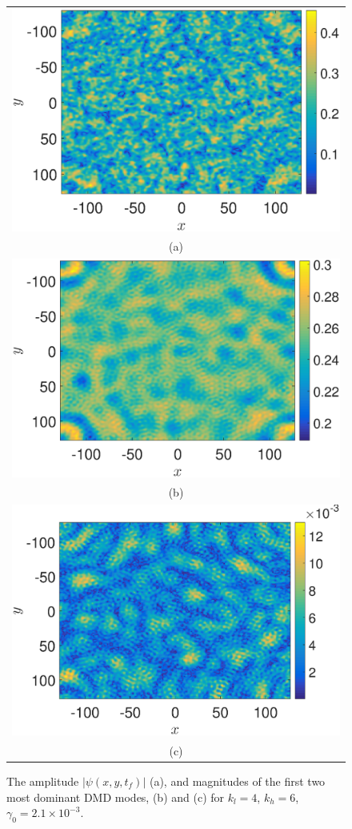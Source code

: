 \documentclass[a4paper,11pt]{article}
\begin{document}
\begin{figure}
\centering
\begin{tabular}{c}
\includegraphics[width=.7\textwidth]{amplitude_wwt_K_128_Lx_128_tf_1pt5e4} \\
(a) \\
\includegraphics[width=.7\textwidth]{dmd1_amplitude_wwt_K_128_Lx_128_tf_1pt5e4} \\
 (b) \\
\includegraphics[width=.7\textwidth]{dmd2_amplitude_wwt_K_128_Lx_128_tf_1pt5e4} \\
(c)
\end{tabular}
\caption{The amplitude $\left|\psi(x,y,t_{f})\right|$ (a), and magnitudes of the first two most dominant DMD modes, (b) and (c) for $k_{l}=4$, $k_{h}=6$, $\gamma_{0}=2.1\times 10^{-3}$.  }
\label{fig:ampcomplfwwt}
\end{figure}
\end{document}
